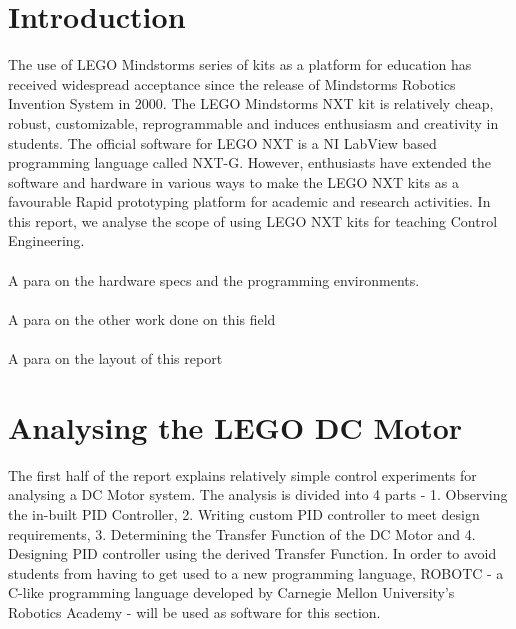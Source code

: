 \documentclass[paper=a4, fontsize=11pt]{scrartcl}
\numberwithin{equation}{section}        %
\numberwithin{figure}{section}          %
\numberwithin{table}{section}           %
\begin{document}
\section{Introduction}
The use of LEGO Mindstorms series of kits as a platform for education has received widespread acceptance since the release of Mindstorms Robotics Invention System in 2000. The LEGO Mindstorms NXT kit is relatively cheap, robust, customizable, reprogrammable and induces enthusiasm and creativity in students. The official software for LEGO NXT is a NI LabView based programming language called NXT-G. However, enthusiasts have extended the software and hardware in various ways to make the LEGO NXT kits as a favourable Rapid prototyping platform for academic and research activities. In this report, we analyse the scope of using LEGO NXT kits for teaching Control Engineering. 
\\~\\
A para on the hardware specs and the programming environments.
\\~\\
A para on the other work done on this field
\\~\\
A para on the layout of this report
\section{Analysing the LEGO DC Motor}
The first half of the report explains relatively simple control experiments for analysing a DC Motor system. The analysis is divided into 4 parts - 1. Observing the in-built PID Controller, 2. Writing custom PID controller to meet design requirements, 3. Determining the Transfer Function of the DC Motor and 4. Designing PID controller using the derived Transfer Function. In order to avoid students from having to get used to a new programming language, ROBOTC - a C-like programming language developed by Carnegie Mellon University's Robotics Academy - will be used as software for this section. 
\end{document}
